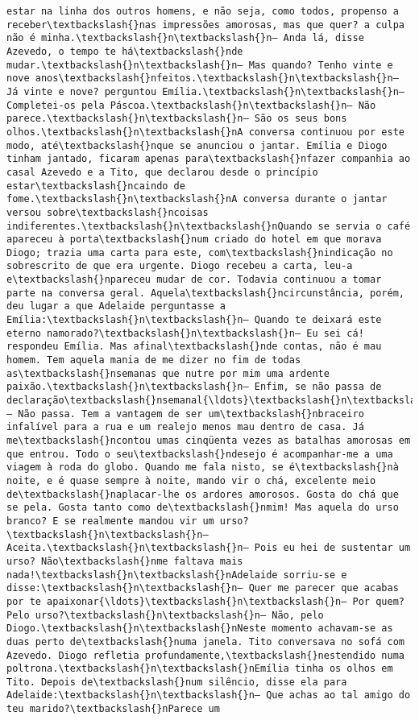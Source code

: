 \documentclass[11pt]{article}
\begin{document}
\begin{Verbatim}[commandchars=\\\{\}]
estar na linha dos outros homens, e não seja, como todos, propenso a receber\textbackslash{}nas impressões amorosas, mas que quer? a culpa não é minha.\textbackslash{}n\textbackslash{}n— Anda lá, disse Azevedo, o tempo te há\textbackslash{}nde mudar.\textbackslash{}n\textbackslash{}n— Mas quando? Tenho vinte e nove anos\textbackslash{}nfeitos.\textbackslash{}n\textbackslash{}n— Já vinte e nove? perguntou Emília.\textbackslash{}n\textbackslash{}n— Completei-os pela Páscoa.\textbackslash{}n\textbackslash{}n— Não parece.\textbackslash{}n\textbackslash{}n— São os seus bons olhos.\textbackslash{}n\textbackslash{}nA conversa continuou por este modo, até\textbackslash{}nque se anunciou o jantar. Emília e Diogo tinham jantado, ficaram apenas para\textbackslash{}nfazer companhia ao casal Azevedo e a Tito, que declarou desde o princípio estar\textbackslash{}ncaindo de fome.\textbackslash{}n\textbackslash{}nA conversa durante o jantar versou sobre\textbackslash{}ncoisas indiferentes.\textbackslash{}n\textbackslash{}nQuando se servia o café apareceu à porta\textbackslash{}num criado do hotel em que morava Diogo; trazia uma carta para este, com\textbackslash{}nindicação no sobrescrito de que era urgente. Diogo recebeu a carta, leu-a e\textbackslash{}npareceu mudar de cor. Todavia continuou a tomar parte na conversa geral. Aquela\textbackslash{}ncircunstância, porém, deu lugar a que Adelaide perguntasse a Emília:\textbackslash{}n\textbackslash{}n— Quando te deixará este eterno namorado?\textbackslash{}n\textbackslash{}n— Eu sei cá! respondeu Emília. Mas afinal\textbackslash{}nde contas, não é mau homem. Tem aquela mania de me dizer no fim de todas as\textbackslash{}nsemanas que nutre por mim uma ardente paixão.\textbackslash{}n\textbackslash{}n— Enfim, se não passa de declaração\textbackslash{}nsemanal{\ldots}\textbackslash{}n\textbackslash{}n— Não passa. Tem a vantagem de ser um\textbackslash{}nbraceiro infalível para a rua e um realejo menos mau dentro de casa. Já me\textbackslash{}ncontou umas cinqüenta vezes as batalhas amorosas em que entrou. Todo o seu\textbackslash{}ndesejo é acompanhar-me a uma viagem à roda do globo. Quando me fala nisto, se é\textbackslash{}nà noite, e é quase sempre à noite, mando vir o chá, excelente meio de\textbackslash{}naplacar-lhe os ardores amorosos. Gosta do chá que se pela. Gosta tanto como de\textbackslash{}nmim! Mas aquela do urso branco? E se realmente mandou vir um urso?\textbackslash{}n\textbackslash{}n— Aceita.\textbackslash{}n\textbackslash{}n— Pois eu hei de sustentar um urso? Não\textbackslash{}nme faltava mais nada!\textbackslash{}n\textbackslash{}nAdelaide sorriu-se e disse:\textbackslash{}n\textbackslash{}n— Quer me parecer que acabas por te apaixonar{\ldots}\textbackslash{}n\textbackslash{}n— Por quem? Pelo urso?\textbackslash{}n\textbackslash{}n— Não, pelo Diogo.\textbackslash{}n\textbackslash{}nNeste momento achavam-se as duas perto de\textbackslash{}numa janela. Tito conversava no sofá com Azevedo. Diogo refletia profundamente,\textbackslash{}nestendido numa poltrona.\textbackslash{}n\textbackslash{}nEmília tinha os olhos em Tito. Depois de\textbackslash{}num silêncio, disse ela para Adelaide:\textbackslash{}n\textbackslash{}n— Que achas ao tal amigo do teu marido?\textbackslash{}nParece um 
\end{Verbatim}
\end{document}
